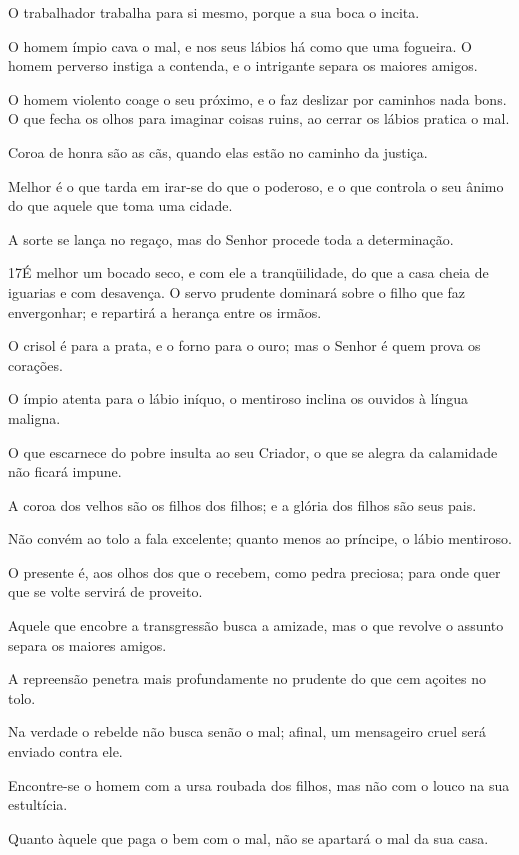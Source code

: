 O trabalhador trabalha para si mesmo, porque a sua boca o incita.

O homem ímpio cava o mal, e nos seus lábios há como que uma
fogueira. O homem perverso instiga a contenda, e o intrigante
separa os maiores amigos.

O homem violento coage o seu próximo, e o faz deslizar por
caminhos nada bons. O que fecha os olhos para imaginar coisas
ruins, ao cerrar os lábios pratica o mal.

Coroa de honra são as cãs, quando elas estão no caminho da
justiça.

Melhor é o que tarda em irar-se do que o poderoso, e o que
controla o seu ânimo do que aquele que toma uma cidade.

A sorte se lança no regaço, mas do Senhor procede toda a
determinação.

\medskip

\lettrine{17}{}É melhor um bocado seco, e com ele a
tranqüilidade, do que a casa cheia de iguarias e com desavença.
 O servo prudente dominará sobre o filho que faz
envergonhar; e repartirá a herança entre os irmãos.

O crisol é para a prata, e o forno para o ouro; mas o Senhor é
quem prova os corações.

O ímpio atenta para o lábio iníquo, o mentiroso inclina os ouvidos
à língua maligna.

O que escarnece do pobre insulta ao seu Criador, o que se alegra
da calamidade não ficará impune.

A coroa dos velhos são os filhos dos filhos; e a glória dos filhos
são seus pais.

Não convém ao tolo a fala excelente; quanto menos ao príncipe, o
lábio mentiroso.

O presente é, aos olhos dos que o recebem, como pedra preciosa;
para onde quer que se volte servirá de proveito.

Aquele que encobre a transgressão busca a amizade, mas o que
revolve o assunto separa os maiores amigos.

A repreensão penetra mais profundamente no prudente do que cem
açoites no tolo.

Na verdade o rebelde não busca senão o mal; afinal, um mensageiro
cruel será enviado contra ele.

Encontre-se o homem com a ursa roubada dos filhos, mas não com o
louco na sua estultícia.

Quanto àquele que paga o bem com o mal, não se apartará o mal da
sua casa.

